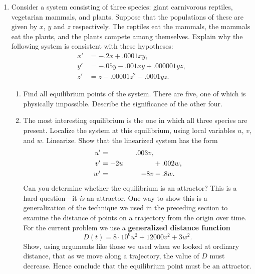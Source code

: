 \begin{enumerate}
\item Consider a system consisting of three species: giant carnivorous
reptiles, vegetarian mammals, and plants.  Suppose that the
populations of these are given by $x$, $y$ and $z$ respectively.  The
reptiles eat the mammals, the mammals eat the plants, and the plants
compete among themselves.  Explain why the following system is
consistent with these hypotheses:
\begin{align*}
x' &= -.2 x + .0001 x y, \\
y' &= -.05 y - .001 x y + .000001 y z, \\
z' &= z - .00001 z^2 - .0001 y z.
\end{align*}


  \begin{enumerate}
  \item Find all equilibrium points of the system.  There are five, one
of which is physically impossible.  Describe the significance of the
other four.

  \item The most interesting equilibrium is the one in which all three
species are present.  Localize the system at this equilibrium, using
local variables $u$, $v$, and $w$. Linearize.  Show that the
linearized system has the form
\begin{alignat*}{2}
u' &=     & \hphantom{-}.003v, &         \\
v' &= -2u &       &+ .002w,  \\
w' &=     & -8v   &- .8w.
\end{alignat*}
Can you determine whether the equilibrium is an attractor?  This is a
hard question---it {\em is\/} an attractor.  One way to show this is a
generalization of the technique we used in the preceding section to
examine the distance of points on a trajectory from the origin over
time.  For the current problem we use a {\bf generalized distance
  function}
\[
D(t) = 8\cdot 10^6u^2+12000v^2+3w^2.
\]
Show, using arguments like those we used when we looked at ordinary
distance, that as we move along a trajectory, the value of $D$ must
decrease.  Hence conclude that the equilibrium point must be an
attractor.



\end{enumerate}
\end{enumerate}
